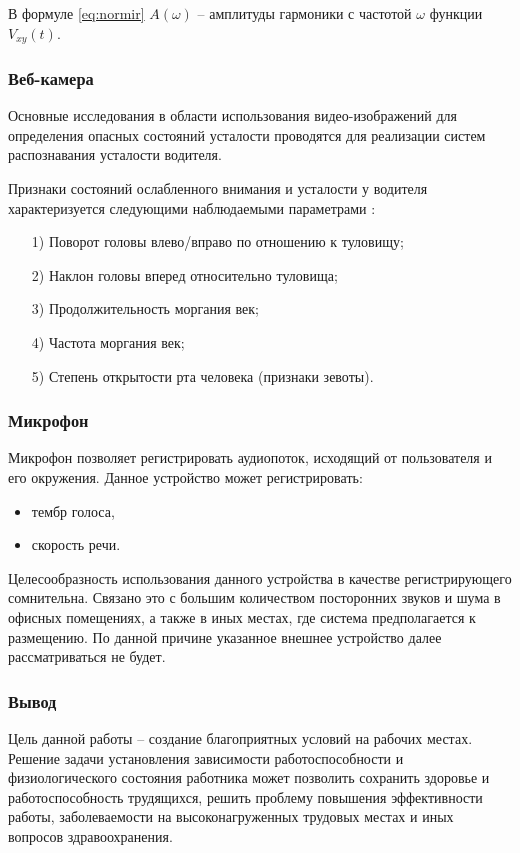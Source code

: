 В формуле \ref{eq:normir} $A(\omega)$ -- амплитуды гармоники с частотой $\omega$ функции $V_{xy}(t)$.

\subsubsection{Веб-камера}
Основные исследования в области использования видео-изображений для определения опасных состояний усталости проводятся для реализации систем распознавания усталости водителя.

Признаки состояний ослабленного внимания и усталости у водителя характеризуется следующими наблюдаемыми параметрами \cite{videoMethod}:
\begin{itemize}[leftmargin=1.6\parindent]
\item[1)] Поворот головы влево/вправо по отношению к туловищу;
\item[2)] Наклон головы вперед относительно туловища;
\item[3)] Продолжительность моргания век;
\item[4)] Частота моргания век;
\item[5)] Степень открытости рта человека (признаки зевоты).
\end{itemize}

\subsubsection{Микрофон}
Микрофон позволяет регистрировать аудиопоток, исходящий от пользователя и его окружения. Данное устройство может регистрировать:
\begin{itemize}
\item тембр голоса,
\item скорость речи.
\end{itemize}

Целесообразность использования данного устройства в качестве регистрирующего сомнительна. Связано это с большим количеством посторонних звуков и шума в офисных помещениях, а также в иных местах, где система предполагается к размещению. По данной причине указанное внешнее устройство далее рассматриваться не будет.

\subsubsection*{Вывод}
Цель данной работы -- создание благоприятных условий на рабочих местах. Решение задачи установления зависимости работоспособности и физиологического состояния работника может позволить сохранить здоровье и работоспособность трудящихся, решить проблему повышения эффективности работы, заболеваемости на высоконагруженных трудовых местах и иных вопросов здравоохранения.

